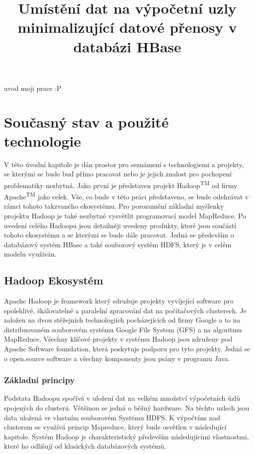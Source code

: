 \documentclass[thesis=M,czech]{FITthesis}[2012/06/26]
\title{Umístění dat na výpočetní uzly minimalizující datové přenosy v databázi HBase}
\begin{document}

\begin{introduction}
	uvod moji prace :P
\end{introduction}

\chapter{Současný stav a použité technologie}
V této úvodní kapitole je dán prostor pro seznámení s technologiemi a projekty, se kterými se bude buď přímo pracovat nebo je jejich znalost pro pochopení problematiky nezbytná. Jako první je představen projekt Hadoop\textsuperscript{TM} od firmy Apache\textsuperscript{TM} jako celek. Vše, co bude v této práci představeno, se bude odehrávat v rámci tohoto takzvaného ekosystému. Pro porozumění základní myšlenky projektu Hadoop je také nezbytné vysvětlit programovací model MapReduce. Po uvedení celého Hadoopu jsou detailněji uvedeny produkty, které jsou součástí tohoto ekosystému a se kterými se bude dále pracovat. Jedná se především o databázový systém HBase a také souborový systém HDFS, který je v celém modelu využíván. 


\section{Hadoop Ekosystém}
Apache Hadoop je framework který sdružuje projekty  vyvíjející software pro spolehlivé, škálovatelné a paralelní zpracování dat na počítačových clusterech. Je založen na dvou stěžejních  technologiích pocházejících od firmy Google  a to na distribuovaném souborovém systému Google File System (GFS) a na algoritmu MapReduce\cite{HadoopDum}. Všechny klíčové projekty v systému Hadoop jsou združeny  pod Apache Software foundation, která poskytuje podporu pro tyto projekty. Jedná se o open.source software a všechny komponenty jsou psány v programu Java.

\subsection{Základní principy}
Podstata Hadoopu spočívá v uložení dat na velkém množství výpočetních úzlů spojených do clusterů. Většinou se jedná o běžný hardware. Na těchto uzlech jsou data uložená ve vlastním souborovém Systému HDFS. K výpočtům nad clusterem se využívá princip Mapreduce, který bude osvětlen v následující kapitole. Systém Hadoop je charakteristický především následujícími vlastnostmi, které ho odlišují od klasických databázových systémů.
\end{document}
